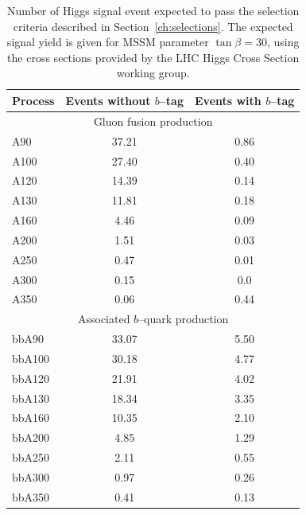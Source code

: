 \begin{table}[t]
\begin{center}
\tablesize
\begin{tabular}{|l|c|c|}
\hline
Process & Events without $b$--tag & Events with $b$--tag \\
\hline
\hline
\multicolumn{3}{|c|}{Gluon fusion production} \\
\hline
A90 & 37.21 & 0.86 \\
A100 & 27.40 & 0.40 \\
A120 & 14.39 & 0.14 \\
A130 & 11.81 & 0.18 \\
A160 & 4.46 & 0.09 \\
A200 & 1.51 & 0.03 \\
A250 & 0.47 & 0.01 \\
A300 & 0.15 & 0.0 \\
A350 & 0.06 & 0.44 \\
\hline
\multicolumn{3}{|c|}{Associated $b$--quark production} \\
\hline
bbA90 & 33.07 &  5.50 \\
bbA100 & 30.18 &  4.77 \\
bbA120 & 21.91 & 4.02 \\
bbA130 & 18.34 & 3.35 \\ 
bbA160 & 10.35 &  2.10 \\
bbA200 & 4.85  &  1.29 \\
bbA250 & 2.11 &  0.55 \\
bbA300 & 0.97 &  0.26 \\
bbA350 & 0.41 & 0.13 \\
\hline
\end{tabular}
\caption[Expected signal yields at \mbox{$\tan \beta = 30$}]{Number of Higgs
signal event expected to pass the selection criteria described in
Section~\ref{ch:selections}.  The expected signal yield is given for MSSM
parameter \mbox{$\tan \beta = 30$}, using the cross sections provided by the LHC
Higgs Cross Section working group.} \label{tab:SignalExpResultsLooseAHtoMuTau}
\end{center}
\end{table}

